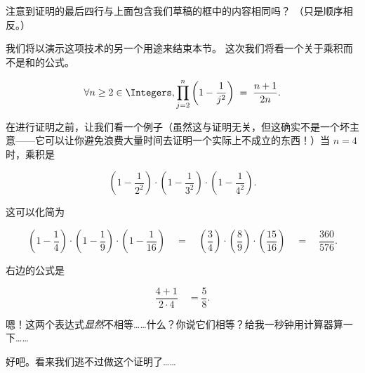 注意到证明的最后四行与上面包含我们草稿的框中的内容相同吗？
（只是顺序相反。）

我们将以演示这项技术的另一个用途来结束本节。
这次我们将看一个关于乘积而不是和的公式。

\begin{thm} $$\forall n \geq 2 \in \Integers, \prod_{j=2}^n \left( 1 - \frac{1}{j^2} \right) \;  = \; \frac{n+1}{2n}.$$
\end{thm}

在进行证明之前，让我们看一个例子（虽然这与证明无关，但这确实不是一个坏主意——它可以让你避免浪费大量时间去证明一个实际上不成立的东西！）当 $n = 4$ 时，乘积是

\[  \left(1-\frac{1}{2^2}\right) \cdot \left(1-\frac{1}{3^2}\right) \cdot \left(1-\frac{1}{4^2}\right).
\]

这可以化简为

\[ \left( 1-\frac{1}{4} \right) \cdot \left( 1-\frac{1}{9} \right) \cdot 
\left( 1-\frac{1}{16} \right) \quad = \quad \left( \frac{3}{4} \right) \cdot \left( \frac{8}{9} \right) \cdot \left( \frac{15}{16} \right) \quad = \quad \frac{360}{576}.
\]

右边的公式是

\[ \frac{4+1}{2 \cdot 4} \quad = \frac{5}{8}. \]

嗯！这两个表达式\emph{显然}不相等……什么？你说它们相等？给我一秒钟用计算器算一下……

好吧。看来我们逃不过做这个证明了……

